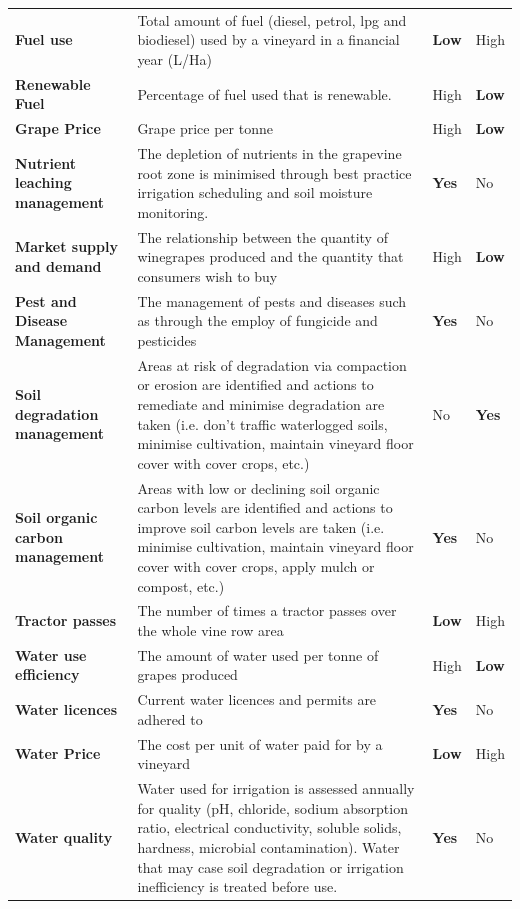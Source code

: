 \begin{table}[h]
\begin{tabular}{@{}llll@{}}
    \textbf{Fuel use} & Total amount of fuel (diesel, petrol, lpg and biodiesel) used by a vineyard in a financial year (L/Ha) & \textbf{Low} & High \\
    \textbf{Renewable Fuel} & Percentage of fuel used that is renewable. & High & \textbf{Low} \\
    \textbf{Grape Price} & Grape price per tonne & High & \textbf{Low} \\
    \textbf{Nutrient leaching management} & The depletion of nutrients in the grapevine root zone is minimised through best practice irrigation scheduling and soil moisture monitoring. & \textbf{Yes} & No \\
    \textbf{Market supply and demand} & The relationship between the quantity of winegrapes produced and the quantity that consumers wish to buy & High & \textbf{Low} \\
    \textbf{Pest and Disease Management} & The management of pests and diseases such as through the employ of fungicide and pesticides & \textbf{Yes} & No \\
    \textbf{Soil degradation management} & Areas at risk of degradation via compaction or erosion are identified and actions to remediate and minimise degradation are taken (i.e. don’t traffic waterlogged soils, minimise cultivation, maintain vineyard floor cover with cover crops, etc.) & No & \textbf{Yes} \\
    \textbf{Soil organic carbon management} & Areas with low or declining soil organic carbon levels are identified and actions to improve soil carbon levels are taken (i.e. minimise cultivation, maintain vineyard floor cover with cover crops, apply mulch or compost, etc.) & \textbf{Yes} & No \\
    \textbf{Tractor passes} & The number of times a tractor passes over the whole vine row area & \textbf{Low} & High \\
    \textbf{Water use efficiency} & The amount of water used per tonne of grapes produced & High & \textbf{Low} \\
    \textbf{Water licences} & Current water licences and permits are adhered to & \textbf{Yes} & No \\
    \textbf{Water Price} & The cost per unit of water paid for by a vineyard & \textbf{Low} & High \\
    \textbf{Water quality} & Water used for irrigation is assessed annually for quality (pH, chloride, sodium absorption ratio, electrical conductivity, soluble solids, hardness, microbial contamination). Water that may case soil degradation or irrigation inefficiency is treated before use. & \textbf{Yes} & No \\

\end{tabular}
\end{table}
